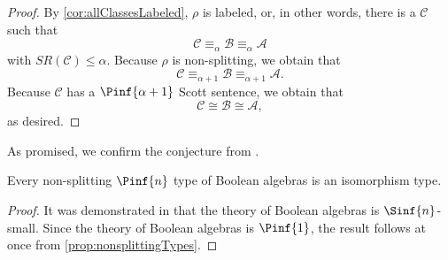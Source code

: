 \documentclass[10pt,a4paper]{amsart}
\renewcommand{\-}{\text{-}}
\begin{document}
\begin{proof}
By \cref{cor:allClassesLabeled}, $\rho$ is labeled, or, in other words, there is a $\mathcal{C}$ such that
\[\mathcal{C}\equiv_\alpha\mathcal{B}\equiv_\alpha\mathcal{A}\]
with $SR(\mathcal{C})\leq\alpha$.
Because $\rho$ is non-splitting, we obtain that 
\[\mathcal{C}\equiv_{\alpha+1}\mathcal{B}\equiv_{\alpha+1}\mathcal{A}.\]
Because $\mathcal{C}$ has a $\Pinf{\alpha+1}$ Scott sentence, we obtain that  
\[\mathcal{C}\cong\mathcal{B}\cong\mathcal{A},\]
as desired.
\end{proof}

As promised, we confirm the conjecture from \cite[Page 21]{HM}.

\begin{corollary}
Every non-splitting $\Pinf{n}$ type of Boolean algebras is an isomorphism type. 
\end{corollary}

\begin{proof}
  It was demonstrated in \cite{HM} that the theory of Boolean algebras is $\Sinf{n}$-small. Since the theory of Boolean algebras is $\Pinf{1}$, the result follows at once from \cref{prop:nonsplittingTypes}.
\end{proof}
\end{document}

